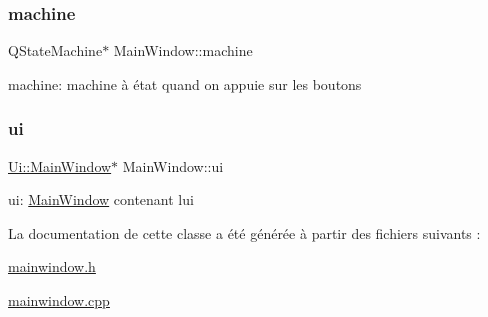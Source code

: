 \subsubsection{\texorpdfstring{machine}{machine}}
{\footnotesize\ttfamily Q\+State\+Machine$\ast$ Main\+Window\+::machine\hspace{0.3cm}{\ttfamily [private]}}

machine\+: machine à état quand on appuie sur les boutons \mbox{\label{classMainWindow_a35466a70ed47252a0191168126a352a5}} 
\subsubsection{\texorpdfstring{ui}{ui}}
{\footnotesize\ttfamily \hyperlink{classUi_1_1MainWindow}{Ui\+::\+Main\+Window}$\ast$ Main\+Window\+::ui\hspace{0.3cm}{\ttfamily [private]}}

ui\+: \hyperlink{classMainWindow}{Main\+Window} contenant l\textquotesingle{}ui 

La documentation de cette classe a été générée à partir des fichiers suivants \+:\begin{DoxyCompactItemize}
\item 
\hyperlink{mainwindow_8h}{mainwindow.\+h}\item 
\hyperlink{mainwindow_8cpp}{mainwindow.\+cpp}\end{DoxyCompactItemize}
